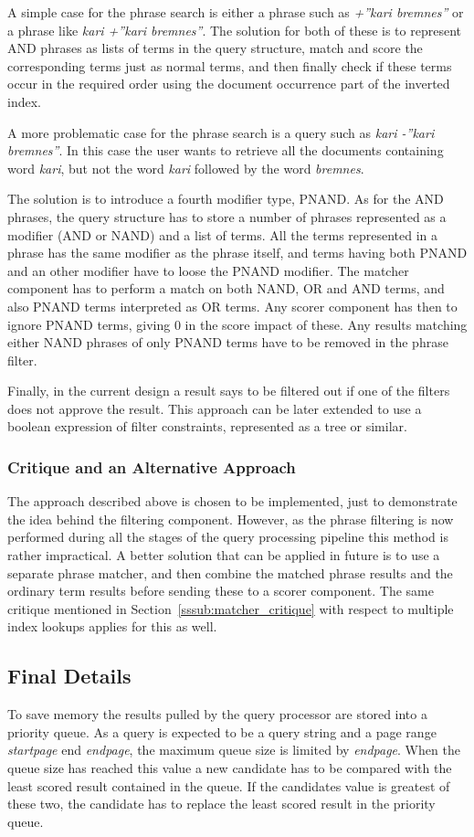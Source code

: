 A simple case for the phrase search is either a phrase such as {\it +''kari bremnes''} or a phrase like {\it kari +''kari bremnes''}. The solution for both of these is to represent AND phrases as lists of terms in the query structure, match and score the corresponding terms just as normal terms, and then finally check if these terms occur in the required order using the document occurrence part of the inverted index.

A more problematic case for the phrase search is a query such as {\it kari -''kari bremnes''}. In this case the user wants to retrieve all the documents containing word {\it kari}, but not the word {\it kari} followed by the word {\it bremnes}.

The solution is to introduce a fourth modifier type, PNAND. As for the AND phrases, the query structure has to store a number of phrases represented as a modifier (AND or NAND) and a list of terms. All the terms represented in a phrase has the same modifier as the phrase itself, and terms having both PNAND and an other modifier have to loose the PNAND modifier. The matcher component has to perform a match on both NAND, OR and AND terms, and also PNAND terms interpreted as OR terms. Any scorer component has then to ignore PNAND terms, giving 0 in the score impact of these. Any results matching either NAND phrases of only PNAND terms have to be removed in the phrase filter.

Finally, in the current design a result says to be filtered out if one of the filters does not approve the result. This approach can be later extended to use a boolean expression of filter constraints, represented as a tree or similar.

\subsubsection{Critique and an Alternative Approach}
The approach described above is chosen to be implemented, just to demonstrate the idea behind the filtering component. However, as the phrase filtering is now performed during all the stages of the query processing pipeline this method is rather impractical. A better solution that can be applied in future is to use a separate phrase matcher, and then combine the matched phrase results and the ordinary term results before sending these to a scorer component. The same critique mentioned in Section~\ref{sssub:matcher_critique} with respect to multiple index lookups applies for this as well.

\subsection{Final Details}
To save memory the results pulled by the query processor are stored into a priority queue. As a query is expected to be a query string and a page range {\it startpage} end {\it endpage}, the maximum queue size is limited by {\it endpage}. When the queue size has reached this value a new candidate has to be compared with the least scored result contained in the queue. If the candidates value is greatest of these two, the candidate has to replace the least scored result in the priority queue.

